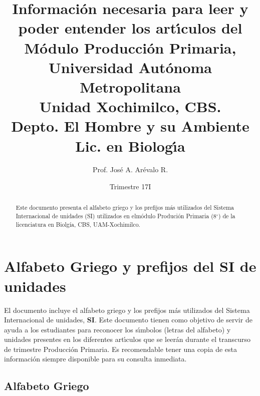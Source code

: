 \documentclass[letterpaper,spanish,12pt]{article}
\begin{document}
\title{Informaci\'{o}n necesaria para leer y poder entender los
  art\'{\i}culos del \\ 
M\'{o}dulo Producci\'{o}n Primaria, \\  
Universidad Aut\'{o}noma Metropolitana \\
Unidad Xochimilco, CBS. \\
Depto. El Hombre y su Ambiente \\
Lic. en Biolog\'{\i}a}

\author{Prof. Jos\'{e} A. Ar\'evalo R.}

\date{Trimestre 17I}

\maketitle

\begin{abstract}

Este documento presenta el alfabeto griego y los prefijos m\'{a}s
utilizados del Sistema Internacional de unidades (SI) utilizados en 
elmódulo Produción Primaria (8$^{\circ}$) de la licenciatura en Biolgía, CBS, UAM-Xochimilco.
\end{abstract}


\section{Alfabeto Griego y prefijos del SI de unidades}

El documento incluye el alfabeto griego y los prefijos m\'{a}s
utilizados del Sistema Internacional de unidades, \textbf{SI}. Este
documento tienen como objetivo de servir de ayuda a
los estudiantes para reconocer los s\'{\i}mbolos (letras del alfabeto) y unidades
presentes en los diferentes art\'{\i}culos que se leer\'{a}n durante
el transcurso de trimestre Producci\'{o}n Primaria. Es
recomendable tener una copia de esta informaci\'{o}n siempre
disponible para su consulta inmediata.

\subsection*{Alfabeto Griego}
\end{document}
